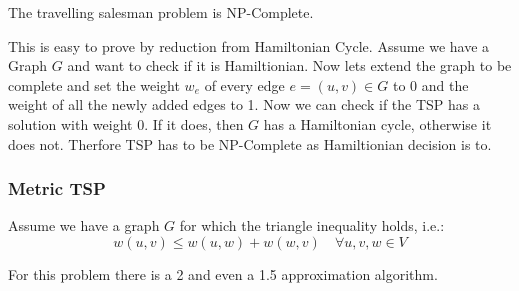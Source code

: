     \begin{theorem}

    The travelling salesman problem is NP-Complete.
    
\end{theorem}

    This is easy to prove by reduction from Hamiltonian Cycle. Assume we have a
    Graph $G$ and want to check if it is Hamiltionian. Now lets extend the graph to be complete and set the
    weight $w_e$ of every edge $e = (u,v) \in G$ to 0 and the weight of all the newly added edges to 1. Now we
    can check if the TSP has a solution with weight 0. If it does, then $G$ has a Hamiltonian cycle, otherwise
    it does not. Therfore TSP has to be NP-Complete as Hamiltionian decision is to.

    \subsubsection{Metric TSP}

    Assume we have a graph $G$ for which the triangle inequality holds, i.e.:
    $$w(u,v) \le w(u,w) + w(w,v) \quad \forall u,v,w \in V$$

    For this problem there is a 2 and even a 1.5 approximation algorithm.

